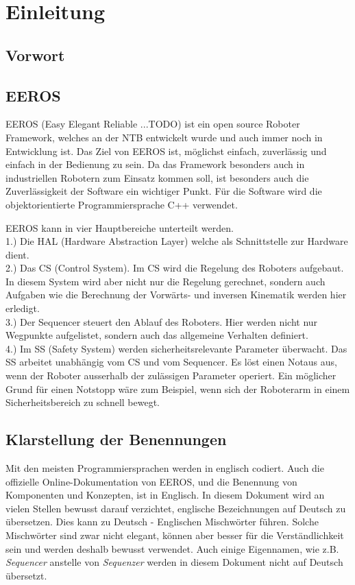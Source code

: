 \chapter{Einleitung}


\section{Vorwort}


\section{EEROS}
EEROS (Easy Elegant Reliable ...TODO) ist ein open source Roboter Framework, welches an der NTB entwickelt wurde und auch immer noch in Entwicklung ist. %
Das Ziel von EEROS ist, möglichst einfach, zuverlässig und einfach in der Bedienung zu sein.
Da das Framework besonders auch in industriellen Robotern zum Einsatz kommen soll, ist besonders auch die Zuverlässigkeit der Software ein wichtiger Punkt.
Für die Software wird die objektorientierte Programmiersprache C++ verwendet. %

EEROS kann in vier Hauptbereiche unterteilt werden.\\
1.) Die HAL (Hardware Abstraction Layer) welche als Schnittstelle zur Hardware dient.\\
2.) Das CS (Control System). Im CS wird die Regelung des Roboters aufgebaut.
In diesem System wird aber nicht nur die Regelung gerechnet, sondern auch Aufgaben wie die Berechnung der Vorwärts- und inversen Kinematik werden hier erledigt.\\
3.) Der Sequencer steuert den Ablauf des Roboters.
Hier werden nicht nur Wegpunkte aufgelistet, sondern auch das allgemeine Verhalten definiert.\\%
4.) Im SS (Safety System) werden sicherheitsrelevante Parameter überwacht. Das SS arbeitet unabhängig vom CS und vom Sequencer. Es löst einen Notaus aus, wenn der Roboter ausserhalb der zulässigen Parameter operiert. Ein möglicher Grund für einen Notstopp wäre zum Beispiel, wenn sich der Roboterarm in einem Sicherheitsbereich zu schnell bewegt.





\section{Klarstellung der Benennungen}
Mit den meisten Programmiersprachen werden in englisch codiert.
Auch die offizielle Online-Dokumentation von EEROS, und die Benennung von Komponenten und Konzepten,  ist in Englisch.
In diesem Dokument wird an vielen Stellen bewusst darauf verzichtet, englische Bezeichnungen auf Deutsch zu übersetzen.
Dies kann zu Deutsch - Englischen Mischwörter führen.
Solche Mischwörter sind zwar nicht elegant, können aber besser für die Verständlichkeit sein und werden deshalb bewusst verwendet. %
Auch einige Eigennamen, wie z.B. \textit{Sequencer} anstelle von \textit{Sequenzer} werden in diesem Dokument nicht auf Deutsch übersetzt.


